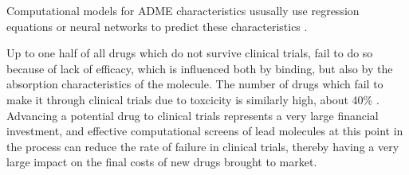 Computational models for ADME characteristics ususally use regression equations or neural networks to predict these characteristics \cite{jorgensen2004many}.

Up to one half of all drugs which do not survive clinical trials, fail to do so because of lack of efficacy, which is influenced both by binding, but also by the absorption characteristics of the molecule.
The number of drugs which fail to make it through clinical trials due to toxcicity is similarly high, about 40\% \cite{li2001screening}.
Advancing a potential drug to clinical trials represents a very large financial investment, and effective computational screens of lead molecules at this point in the process can reduce the rate of failure in clinical trials, thereby having a very large impact on the final costs of new drugs brought to market.
